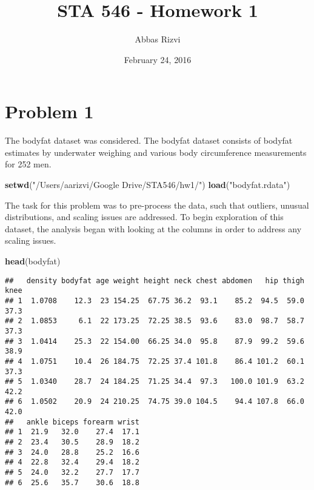 \documentclass[]{article}
\title{STA 546 - Homework 1}
\author{Abbas Rizvi}
\date{February 24, 2016}
\newenvironment{Shaded}{\begin{snugshade}}{\end{snugshade}}
\newcommand{\KeywordTok}[1]{\textcolor[rgb]{0.13,0.29,0.53}{\textbf{{#1}}}}
\newcommand{\StringTok}[1]{\textcolor[rgb]{0.31,0.60,0.02}{{#1}}}
\newcommand{\NormalTok}[1]{{#1}}
\begin{document}
\maketitle


\section{Problem 1}\label{problem-1}

The bodyfat dataset was considered. The bodyfat dataset consists of
bodyfat estimates by underwater weighing and various body circumference
measurements for 252 men.

\begin{Shaded}
\begin{Highlighting}[]
\KeywordTok{setwd}\NormalTok{(}\StringTok{"/Users/aarizvi/Google Drive/STA546/hw1/"}\NormalTok{)}
\KeywordTok{load}\NormalTok{(}\StringTok{"bodyfat.rdata"}\NormalTok{)}
\end{Highlighting}
\end{Shaded}

The task for this problem was to pre-process the data, such that
outliers, unusual distributions, and scaling issues are addressed. To
begin exploration of this dataset, the analysis began with looking at
the columns in order to address any scaling issues.

\begin{Shaded}
\begin{Highlighting}[]
\KeywordTok{head}\NormalTok{(bodyfat)}
\end{Highlighting}
\end{Shaded}

\begin{verbatim}
##   density bodyfat age weight height neck chest abdomen   hip thigh knee
## 1  1.0708    12.3  23 154.25  67.75 36.2  93.1    85.2  94.5  59.0 37.3
## 2  1.0853     6.1  22 173.25  72.25 38.5  93.6    83.0  98.7  58.7 37.3
## 3  1.0414    25.3  22 154.00  66.25 34.0  95.8    87.9  99.2  59.6 38.9
## 4  1.0751    10.4  26 184.75  72.25 37.4 101.8    86.4 101.2  60.1 37.3
## 5  1.0340    28.7  24 184.25  71.25 34.4  97.3   100.0 101.9  63.2 42.2
## 6  1.0502    20.9  24 210.25  74.75 39.0 104.5    94.4 107.8  66.0 42.0
##   ankle biceps forearm wrist
## 1  21.9   32.0    27.4  17.1
## 2  23.4   30.5    28.9  18.2
## 3  24.0   28.8    25.2  16.6
## 4  22.8   32.4    29.4  18.2
## 5  24.0   32.2    27.7  17.7
## 6  25.6   35.7    30.6  18.8
\end{verbatim}
\end{document}
